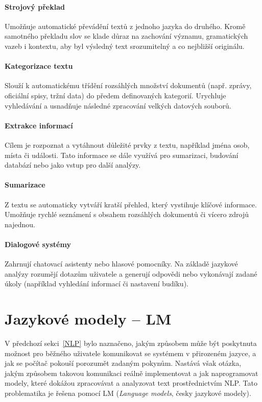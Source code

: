 \paragraph{Strojový překlad}
Umožňuje automatické převádění textů z jednoho jazyka do druhého. Kromě samotného překladu slov se klade důraz na zachování významu, gramatických vazeb i kontextu, aby byl výsledný text srozumitelný a co nejbližší originálu.

\paragraph{Kategorizace textu}
Slouží k automatickému třídění rozsáhlých množství dokumentů (např. zprávy, oficiální spisy, tržní data) do předem definovaných kategorií. Urychluje vyhledávání a usnadňuje následné zpracování velkých datových souborů.

\paragraph{Extrakce informací}
Cílem je rozpoznat a vytáhnout důležité prvky z textu, například jména osob, místa či události. Tato informace se dále využívá pro sumarizaci, budování databází nebo jako vstup pro další analýzy.

\paragraph{Sumarizace}
Z textu se automaticky vytváří kratší přehled, který vystihuje klíčové informace. Umožňuje rychlé seznámení s obsahem rozsáhlých dokumentů či vícero zdrojů najednou.

\paragraph{Dialogové systémy}
Zahrnují chatovací asistenty nebo hlasové pomocníky. Na základě jazykové analýzy rozumějí dotazům uživatele a generují odpovědi nebo vykonávají zadané úkoly (například vyhledání informací či nastavení budíku).~\cite{Khurana2023}

\section{Jazykové modely -- LM}\label{LM}
V předchozí sekci~\ref{NLP} bylo naznačeno, jakým způsobem může být poskytnuta možnost pro běžného uživatele komunikovat se systémem v přirozeném jazyce, a jak se počítač pokouší porozumět zadaným pokynům. Nastává však otázka, jakým způsobem takovou komunikaci reálně implementovat a jak naprogramovat modely, které dokážou zpracovávat a analyzovat text prostřednictvím NLP. Tato problematika je řešena pomocí LM (\emph{Language models}, česky jazykové modely).

